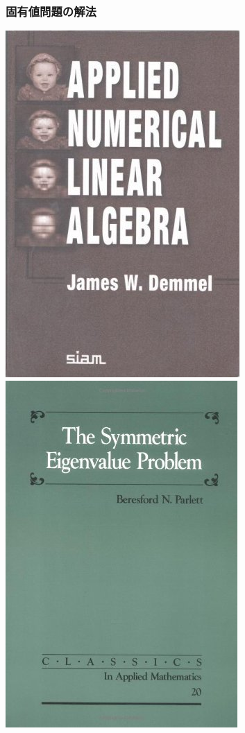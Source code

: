 \begin{frame}
  \frametitle{固有値問題の解法}
  \begin{center}
    \includegraphics[height=0.45\textheight]{figure/AppliedNumericalLinearAlgebra.jpg} \ \
    \includegraphics[height=0.45\textheight]{figure/TheSymmetricEigenvalueProblem.jpg} \ \

\end{center}
\end{frame}
